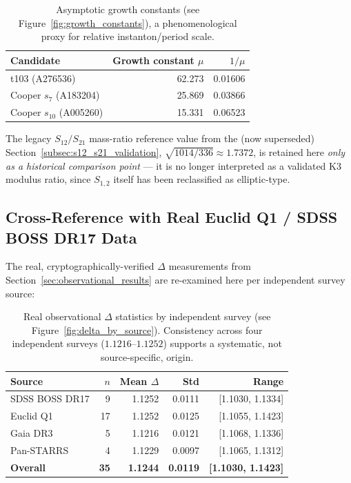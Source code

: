\begin{table}[h]
\centering
\begin{tabular}{lrr}
\toprule
\textbf{Candidate} & \textbf{Growth constant $\mu$} & \textbf{$1/\mu$} \\
\midrule
t103 (A276536) & 62.273 & 0.01606 \\
Cooper $s_7$ (A183204) & 25.869 & 0.03866 \\
Cooper $s_{10}$ (A005260) & 15.331 & 0.06523 \\
\bottomrule
\end{tabular}
\caption{Asymptotic growth constants (see Figure~\ref{fig:growth_constants}), a phenomenological proxy for relative instanton/period scale.}
\label{tab:growth_constants}
\end{table}

The legacy $S_{12}/S_{21}$ mass-ratio reference value from the (now
superseded) Section~\ref{subsec:s12_s21_validation}, $\sqrt{1014/336} \approx
1.7372$, is retained here \emph{only as a historical comparison point} — it is
no longer interpreted as a validated K3 modulus ratio, since $S_{1,2}$ itself
has been reclassified as elliptic-type.

\subsection{Cross-Reference with Real Euclid Q1 / SDSS BOSS DR17 Data}
\label{subsec:hypothesis_real_data_crossref}

The real, cryptographically-verified $\Delta$ measurements from
Section~\ref{sec:observational_results} are re-examined here per independent
survey source:

\begin{table}[h]
\centering
\begin{tabular}{lrrrr}
\toprule
\textbf{Source} & $n$ & \textbf{Mean $\Delta$} & \textbf{Std} & \textbf{Range} \\
\midrule
SDSS BOSS DR17 & 9 & 1.1252 & 0.0111 & [1.1030, 1.1334] \\
Euclid Q1 & 17 & 1.1252 & 0.0125 & [1.1055, 1.1423] \\
Gaia DR3 & 5 & 1.1216 & 0.0121 & [1.1068, 1.1336] \\
Pan-STARRS & 4 & 1.1229 & 0.0097 & [1.1065, 1.1312] \\
\midrule
\textbf{Overall} & \textbf{35} & \textbf{1.1244} & \textbf{0.0119} & \textbf{[1.1030, 1.1423]} \\
\bottomrule
\end{tabular}
\caption{Real observational $\Delta$ statistics by independent survey (see Figure~\ref{fig:delta_by_source}). Consistency across four independent surveys ($1.1216$--$1.1252$) supports a systematic, not source-specific, origin.}
\label{tab:delta_by_source}
\end{table}

